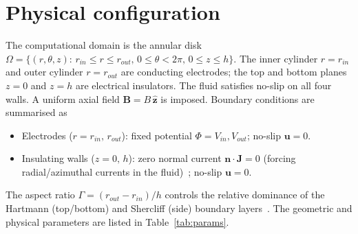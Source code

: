 \documentclass[aps,prl,twocolumn,superscriptaddress]{revtex4-2}
\begin{document}
\section{Physical configuration}

The computational domain is the annular disk
$\Omega = \{(r,\theta,z):\, r_{in} \le r \le r_{out},\,
0 \le \theta < 2\pi,\, 0 \le z \le h\}$.  The inner cylinder
$r = r_{in}$ and outer cylinder $r = r_{out}$ are conducting
electrodes; the top and bottom planes $z = 0$ and $z = h$ are
electrical insulators.  The fluid satisfies no-slip on all four walls.
A uniform axial field $\mathbf{B} = B\,\hat{\mathbf{z}}$ is imposed.
Boundary conditions are summarised as
\begin{itemize}
\item Electrodes ($r = r_{in},\, r_{out}$): fixed potential
  $\Phi = V_{in}, V_{out}$; no-slip $\mathbf{u} = 0$.
\item Insulating walls ($z = 0,\, h$): zero normal current
  $\mathbf{n}\!\cdot\!\mathbf{J} = 0$ (forcing radial/azimuthal currents
  in the fluid)~\cite{8}; no-slip $\mathbf{u} = 0$.
\end{itemize}
The aspect ratio $\Gamma = (r_{out} - r_{in})/h$ controls the
relative dominance of the Hartmann (top/bottom) and Shercliff (side)
boundary layers~\cite{2}.  The geometric and physical parameters are
listed in Table~\ref{tab:params}.
\end{document}
